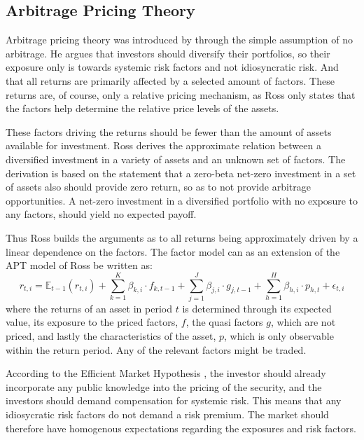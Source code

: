 
\subsection{Arbitrage Pricing Theory}

Arbitrage pricing theory was introduced by \cite{ross1976arbitrage} through the simple assumption of no arbitrage. He argues that investors should diversify their portfolios, so their exposure only is towards systemic risk factors and not idiosyncratic risk. And that all returns are primarily affected by a selected amount of factors. These returns are, of course, only a relative pricing mechanism, as Ross only states that the factors help determine the relative price levels of the assets. 

These factors driving the returns should be fewer than the amount of assets available for investment. Ross derives the approximate relation between a diversified investment in a variety of assets and an unknown set of factors. The derivation is based on the statement that a zero-beta net-zero investment in a set of assets also should provide zero return, so as to not provide arbitrage opportunities. A net-zero investment in a diversified portfolio with no exposure to any factors, should yield no expected payoff. 

Thus Ross builds the arguments as to all returns being approximately driven by a linear dependence on the factors. The factor model can as an extension of the APT model of Ross be written as:
\begin{equation}
	r_{t,i}=\mathbb{E}_{t-1}\left(r_{t,i}\right)+\sum_{k=1}^{K}\beta_{k,i}\cdot f_{k,t-1}+\sum_{j=1}^{J}\beta_{j,i}\cdot g_{j,t-1}+\sum_{h=1}^{H}\beta_{h,i}\cdot p_{h,t}+\epsilon_{t,i}
\end{equation}
where the returns of an asset in period $t$ is determined through its expected value, its exposure to the priced factors, $f$, the quasi factors $g$, which are not priced, and lastly the characteristics of the asset, $p$, which is only observable within the return period. Any of the relevant factors might be traded.

According to the Efficient Market Hypothesis \cite{fama1970efficient}, the investor should already incorporate any public knowledge into the pricing of the security, and the investors should demand compensation for systemic risk. This means that any idiosycratic risk factors do not demand a risk premium. The market should therefore have homogenous expectations regarding the exposures and risk factors.

